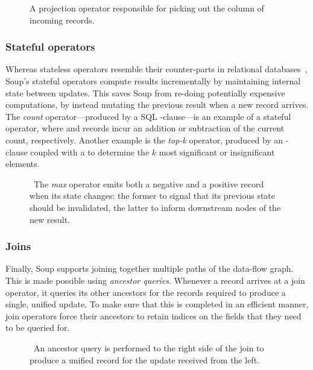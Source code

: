 \begin{figure}[H]
  \centering
  
  \caption{A projection operator responsible for picking out the 
  column of incoming records.}\label{fig:project}
\end{figure}

\subsubsection{Stateful operators}

Whereas stateless operators resemble their counter-parts in relational
databases~\cite{codd}, Soup's stateful operators compute results incrementally
by maintaining internal state between updates. This saves Soup from re-doing
potentially expensive computations, by instead mutating the previous result when
a new record arrives. The \textit{count} operator---produced by a SQL
-clause---is an example of a stateful operator, where
 and  records incur an addition or subtraction of
the current count, respectively. Another example is the \textit{top-k} operator,
produced by \eg an -clause coupled with a  to
determine the $ k $ most significant or insignificant elements.

\begin{figure}[H]
  \centering
  
  \caption{\
    The \textit{max} operator emits both a negative and a positive record when
    its state changes: the former to signal that its previous state should be
    invalidated, the latter to inform downstream nodes of the new result.
  }
\end{figure}

\subsubsection{Joins}

Finally, Soup supports joining together multiple paths of the data-flow graph.
This is made possible using \textit{ancestor queries}. Whenever a record arrives
at a join operator, it queries its other ancestors for the records required to
produce a single, unified update. To make sure that this is completed in an
efficient manner, join operators force their ancestors to retain indices on the
fields that they need to be queried for.

\begin{figure}[H]
  \centering
  
  \caption{\
    An ancestor query is performed to the right side of the join to produce a
    unified record for the update received from the left.
  }
\end{figure}

